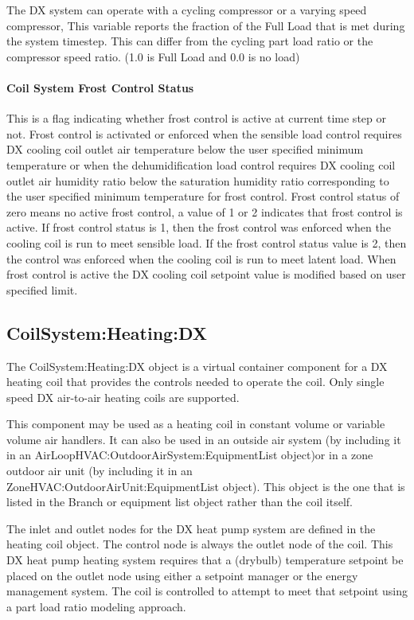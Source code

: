 The DX system can operate with a cycling compressor or a varying speed compressor, This variable reports the fraction of the Full Load that is met during the system timestep. This can differ from the cycling part load ratio or the compressor speed ratio. (1.0 is Full Load and 0.0 is no load)

\paragraph{Coil System Frost Control Status}\label{coil-system-frost-control-status}

This is a flag indicating whether frost control is active at current time step or not. Frost control is activated or enforced when the sensible load control requires DX cooling coil outlet air temperature below the user specified minimum temperature or when the dehumidification load control requires DX cooling coil outlet air humidity ratio below the saturation humidity ratio corresponding to the user specified minimum temperature for frost control. Frost control status of zero means no active frost control, a value of 1 or 2 indicates that frost control is active. If frost control status is 1, then the frost control was enforced when the cooling coil is run to meet sensible load. If the frost control status value is 2, then the control was enforced when the cooling coil is run to meet latent load. When frost control is active the DX cooling coil setpoint value is modified based on user specified limit.

\subsection{CoilSystem:Heating:DX}\label{coilsystemheatingdx}

The CoilSystem:Heating:DX object is a virtual container component for a DX heating coil that provides the controls needed to operate the coil. Only single speed DX air-to-air heating coils are supported.

This component may be used as a heating coil in constant volume or variable volume air handlers. It can also be used in an outside air system (by including it in an AirLoopHVAC:OutdoorAirSystem:EquipmentList object)or in a zone outdoor air unit (by including it in an ZoneHVAC:OutdoorAirUnit:EquipmentList object). This object is the one that is listed in the Branch or equipment list object rather than the coil itself.

The inlet and outlet nodes for the DX heat pump system are defined in the heating coil object. The control node is always the outlet node of the coil. This DX heat pump heating system requires that a (drybulb) temperature setpoint be placed on the outlet node using either a setpoint manager or the energy management system. The coil is controlled to attempt to meet that setpoint using a part load ratio modeling approach.


